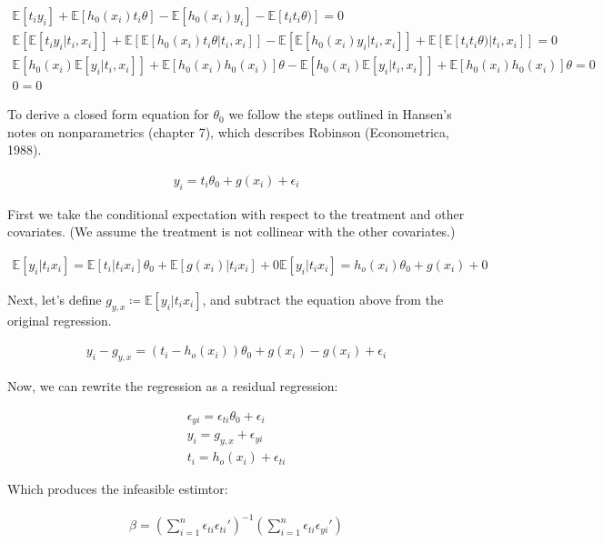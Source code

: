 \documentclass[12pt]{article}
\newcommand{\E}{\mathbb{E}}
\begin{document}
\begin{gather*}
\E[t_i y_i] + \E[h_0(x_i)t_i\theta] - \E[h_0(x_i)y_i] - \E[t_i t_i\theta)] = 0 \\
\E[\E[t_i y_i |t_i, x_i]] + \E[\E[h_0(x_i)t_i\theta|t_i, x_i]]  - \E[\E[h_0(x_i)y_i |t_i, x_i]]  + \E[\E[t_it_i\theta) |t_i, x_i]]  = 0 \\
\E[h_0(x_i) \E[y_i |t_i, x_i]] + \E[h_0(x_i)h_0(x_i)]\theta  - \E[h_0(x_i) \E[y_i |t_i, x_i]]  + \E[h_0(x_i)h_0(x_i)]\theta   = 0 \\
0=0
\end{gather*}

To derive a closed form equation for $\theta_0$ we follow the steps outlined in Hansen's notes on nonparametrics (chapter 7), which describes Robinson (Econometrica, 1988).

\begin{gather*}
y_i = t_i\theta_0 + g(x_i) + \epsilon_i
\end{gather*}

First we take the conditional expectation with respect to the treatment and other covariates. (We assume the treatment is not collinear with the other covariates.)

\begin{gather*}
\E[y_i|t_i x_i] = \E[t_i|t_i x_i]\theta_0 + \E[g(x_i)|t_i x_i]  + 0
\E[y_i|t_i x_i] = h_o(x_i)\theta_0 + g(x_i) + 0
\end{gather*}

Next, let's define $ g_{y,x}  \coloneqq \E[y_i|t_i x_i]$, and subtract the equation above from the original regression.


\begin{gather*}
y_i - g_{y,x} = (t_i -  h_o(x_i))\theta_0 + g(x_i) - g(x_i) + \epsilon_i
\end{gather*}

Now, we can rewrite the regression as a residual regression:

\begin{gather*}
\epsilon_{yi} =  \epsilon_{ti}\theta_0 + \epsilon_i\\
y_i = g_{y,x} + \epsilon_{yi}\\
t_i =  h_o(x_i) + \epsilon_{ti}
\end{gather*}

Which produces the infeasible estimtor:

\begin{gather*}
\beta = \left( \sum\limits_{i=1}^n \epsilon_{ti} \epsilon_{ti}' \right)^{-1} \left( \sum\limits_{i=1}^n \epsilon_{ti} \epsilon_{yi}' \right)
\end{gather*}
\end{document}
